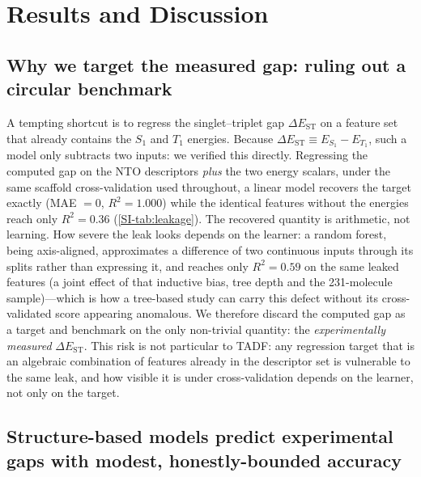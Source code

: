 
\section{Results and Discussion}\label{sec:results}

\subsection{Why we target the measured gap: ruling out a circular benchmark}\label{subsec:circularity}

A tempting shortcut is to regress the singlet--triplet gap $\Delta E_\text{ST}$ on a
feature set that already contains the $S_1$ and $T_1$ energies. Because
$\Delta E_\text{ST} \equiv E_{S_1} - E_{T_1}$, such a model only subtracts two inputs:
we verified this directly. Regressing the computed gap on the NTO descriptors
\emph{plus} the two energy scalars, under the same scaffold cross-validation used
throughout, a linear model recovers the target exactly (MAE $= 0$, $R^2 = 1.000$) while
the identical features without the energies reach only $R^2 = 0.36$
(\cref{SI-tab:leakage}). The recovered quantity is arithmetic, not learning. How
severe the leak looks depends on the learner: a random forest, being axis-aligned,
approximates a difference of two continuous inputs through its splits rather than
expressing it, and reaches only $R^2 = 0.59$ on the same leaked features (a joint
effect of that inductive bias, tree depth and the \num{231}-molecule sample)---which
is how a tree-based study can carry this defect without its cross-validated score
appearing anomalous. We therefore discard the
computed gap as a target and benchmark on the only non-trivial quantity: the
\emph{experimentally measured} $\Delta E_\text{ST}$. This risk is not particular to
TADF: any regression target that is an algebraic combination of features already in
the descriptor set is vulnerable to the same leak, and how visible it is under
cross-validation depends on the learner, not only on the target.

\subsection{Structure-based models predict experimental gaps with modest, honestly-bounded accuracy}\label{subsec:benchmark}

